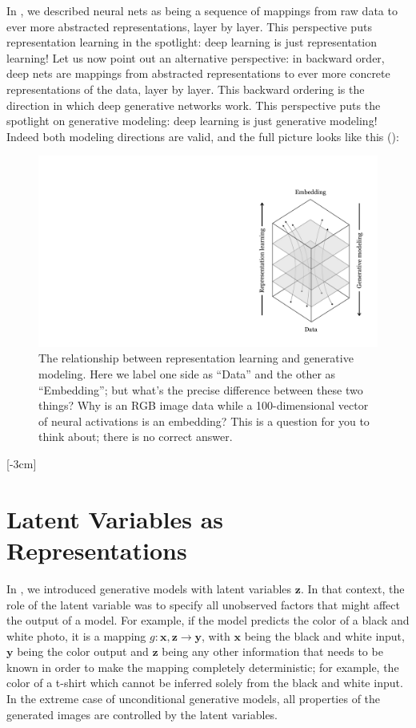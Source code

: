 In \chap{\ref{chapter:neural_nets}}, we described neural nets as being a sequence of mappings from raw data to ever more abstracted representations, layer by layer. This perspective puts representation learning in the spotlight: deep learning is just representation learning! Let us now point out an alternative perspective: in backward order, deep nets are mappings from abstracted representations to ever more concrete representations of the data, layer by layer. This backward ordering is the direction in which deep generative networks work. This perspective puts the spotlight on generative modeling: deep learning is just generative modeling! Indeed both modeling directions are valid, and the full picture looks like this (\fig{\ref{fig:generative_modeling_and_representation_learning:rep_gen_schematic}}):
\begin{figure}[h!]
    \centerline{
    \includegraphics[width=0.35\linewidth]{./figures/generative_modeling_and_representation_learning/rep_gen_schematic.pdf}
    }
    \caption{The relationship between representation learning and generative modeling. Here we label one side as ``Data'' and the other as ``Embedding''; but what's the precise difference between these two things? Why is an RGB image data while a 100-dimensional vector of neural activations is an embedding? This is a question for you to think about; there is no correct answer.}
    \label{fig:generative_modeling_and_representation_learning:rep_gen_schematic}
\end{figure}
[-3cm]


\section{Latent Variables as Representations}

In \chap{\ref{chapter:generative_models}}, we introduced generative models with latent variables $\mathbf{z}$. In that context, the role of the latent variable was to specify all unobserved factors that might affect the output of a model. For example, if the model predicts the color of a black and white photo, it is a mapping $g: \mathbf{x}, \mathbf{z} \rightarrow \mathbf{y}$, with $\mathbf{x}$ being the black and white input, $\mathbf{y}$ being the color output and $\mathbf{z}$ being any other information that needs to be known in order to make the mapping completely deterministic; for example, the color of a t-shirt which cannot be inferred solely from the black and white input. In the extreme case of unconditional generative models, all properties of the generated images are controlled by the latent variables.


